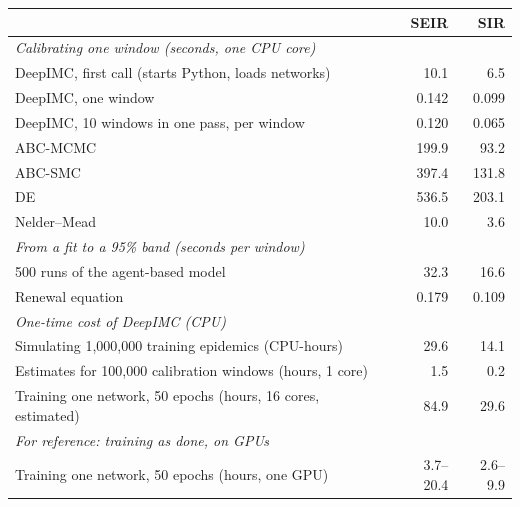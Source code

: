 \begin{tabular}{lrr}
\toprule
 & SEIR & SIR \\
\midrule
\multicolumn{3}{l}{\textit{Calibrating one window (seconds, one CPU core)}} \\
DeepIMC, first call (starts Python, loads networks) & 10.1 & 6.5 \\
DeepIMC, one window & 0.142 & 0.099 \\
DeepIMC, 10 windows in one pass, per window & 0.120 & 0.065 \\
ABC-MCMC & 199.9 & 93.2 \\
ABC-SMC & 397.4 & 131.8 \\
DE & 536.5 & 203.1 \\
Nelder--Mead & 10.0 & 3.6 \\
\midrule
\multicolumn{3}{l}{\textit{From a fit to a 95\% band (seconds per window)}} \\
500 runs of the agent-based model & 32.3 & 16.6 \\
Renewal equation & 0.179 & 0.109 \\
\midrule
\multicolumn{3}{l}{\textit{One-time cost of DeepIMC (CPU)}} \\
Simulating 1,000,000 training epidemics (CPU-hours) & 29.6 & 14.1 \\
Estimates for 100,000 calibration windows (hours, 1 core) & 1.5 & 0.2 \\
Training one network, 50 epochs (hours, 16 cores, estimated) & 84.9 & 29.6 \\
\midrule
\multicolumn{3}{l}{\textit{For reference: training as done, on GPUs}} \\
Training one network, 50 epochs (hours, one GPU) & 3.7--20.4 & 2.6--9.9 \\
\bottomrule
\end{tabular}

